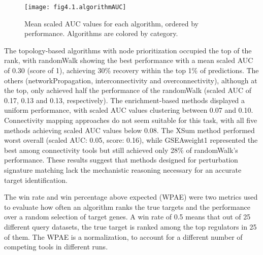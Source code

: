 \begin{figure}[htbp]
    \centering
    \texttt{[image: fig4.1.algorithmAUC]}
    \caption[Mean scaled \gls{AUC} values for each algorithm.]{Mean scaled \gls{AUC} values for each algorithm, ordered by performance. Algorithms are colored by category.}
    \label{fig:fig4.1.algorithmAUC}
\end{figure}

The topology-based algorithms with node prioritization occupied the top of the rank, with randomWalk showing the best performance with a mean scaled \gls{AUC} of 0.30 (score of 1), achieving 30\% recovery within the top 1\% of predictions. The others (networkPropagation, interconnectivity and overconnectivity), although at the top, only achieved half the performance of the randomWalk (scaled \gls{AUC} of 0.17, 0.13 and 0.13, respectively). The enrichment-based methods displayed a uniform performance, with scaled \gls{AUC} values clustering between 0.07 and 0.10. Connectivity mapping approaches do not seem suitable for this task, with all five methods achieving scaled \gls{AUC} values below 0.08. The XSum method performed worst overall (scaled \gls{AUC}: 0.05, score: 0.16), while GSEAweight1 represented the best among connectivity tools but still achieved only 28\% of randomWalk's performance. These results suggest that methods designed for perturbation signature matching lack the mechanistic reasoning necessary for an accurate target identification.

The win rate and win percentage above expected (WPAE) were two metrics used to evaluate how often an algorithm ranks the true targets and the performance over a random selection of target genes. A win rate of 0.5 means that out of 25 different query datasets, the true target is ranked among the top regulators in 25 of them. The WPAE is a normalization, to account for a different number of competing tools in different runs. 

